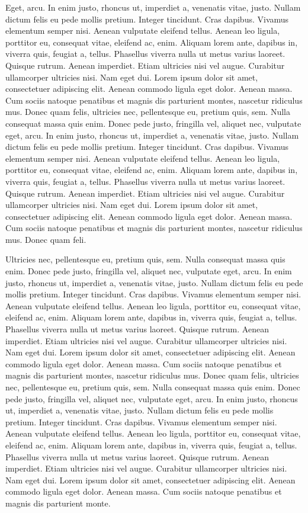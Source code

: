 \documentclass[
    12pt,
    letterpaper,
    oneside,
    noraggedright
]{turabian-researchpaper}
\begin{document}
Eget, arcu. In enim justo, rhoncus ut, imperdiet a, venenatis vitae,
justo. Nullam dictum felis eu pede mollis pretium. Integer tincidunt.
Cras dapibus. Vivamus elementum semper nisi. Aenean vulputate eleifend
tellus. Aenean leo ligula, porttitor eu, consequat vitae, eleifend ac,
enim. Aliquam lorem ante, dapibus in, viverra quis, feugiat a, tellus.
Phasellus viverra nulla ut metus varius laoreet. Quisque rutrum. Aenean
imperdiet. Etiam ultricies nisi vel augue. Curabitur ullamcorper
ultricies nisi. Nam eget dui. Lorem ipsum dolor sit amet, consectetuer
adipiscing elit. Aenean commodo ligula eget dolor. Aenean massa. Cum
sociis natoque penatibus et magnis dis parturient montes, nascetur
ridiculus mus. Donec quam felis, ultricies nec, pellentesque eu, pretium
quis, sem. Nulla consequat massa quis enim. Donec pede justo, fringilla
vel, aliquet nec, vulputate eget, arcu. In enim justo, rhoncus ut,
imperdiet a, venenatis vitae, justo. Nullam dictum felis eu pede mollis
pretium. Integer tincidunt. Cras dapibus. Vivamus elementum semper nisi.
Aenean vulputate eleifend tellus. Aenean leo ligula, porttitor eu,
consequat vitae, eleifend ac, enim. Aliquam lorem ante, dapibus in,
viverra quis, feugiat a, tellus. Phasellus viverra nulla ut metus varius
laoreet. Quisque rutrum. Aenean imperdiet. Etiam ultricies nisi vel
augue. Curabitur ullamcorper ultricies nisi. Nam eget dui. Lorem ipsum
dolor sit amet, consectetuer adipiscing elit. Aenean commodo ligula eget
dolor. Aenean massa. Cum sociis natoque penatibus et magnis dis
parturient montes, nascetur ridiculus mus. Donec quam feli.

Ultricies nec, pellentesque eu, pretium quis, sem. Nulla consequat massa
quis enim. Donec pede justo, fringilla vel, aliquet nec, vulputate eget,
arcu. In enim justo, rhoncus ut, imperdiet a, venenatis vitae, justo.
Nullam dictum felis eu pede mollis pretium. Integer tincidunt. Cras
dapibus. Vivamus elementum semper nisi. Aenean vulputate eleifend
tellus. Aenean leo ligula, porttitor eu, consequat vitae, eleifend ac,
enim. Aliquam lorem ante, dapibus in, viverra quis, feugiat a, tellus.
Phasellus viverra nulla ut metus varius laoreet. Quisque rutrum. Aenean
imperdiet. Etiam ultricies nisi vel augue. Curabitur ullamcorper
ultricies nisi. Nam eget dui. Lorem ipsum dolor sit amet, consectetuer
adipiscing elit. Aenean commodo ligula eget dolor. Aenean massa. Cum
sociis natoque penatibus et magnis dis parturient montes, nascetur
ridiculus mus. Donec quam felis, ultricies nec, pellentesque eu, pretium
quis, sem. Nulla consequat massa quis enim. Donec pede justo, fringilla
vel, aliquet nec, vulputate eget, arcu. In enim justo, rhoncus ut,
imperdiet a, venenatis vitae, justo. Nullam dictum felis eu pede mollis
pretium. Integer tincidunt. Cras dapibus. Vivamus elementum semper nisi.
Aenean vulputate eleifend tellus. Aenean leo ligula, porttitor eu,
consequat vitae, eleifend ac, enim. Aliquam lorem ante, dapibus in,
viverra quis, feugiat a, tellus. Phasellus viverra nulla ut metus varius
laoreet. Quisque rutrum. Aenean imperdiet. Etiam ultricies nisi vel
augue. Curabitur ullamcorper ultricies nisi. Nam eget dui. Lorem ipsum
dolor sit amet, consectetuer adipiscing elit. Aenean commodo ligula eget
dolor. Aenean massa. Cum sociis natoque penatibus et magnis dis
parturient monte.
\end{document}
